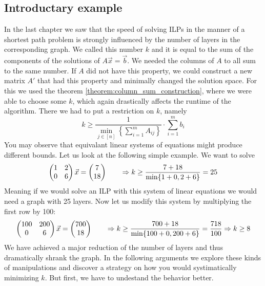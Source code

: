 \subsection{Introductary example}
In the last chapter we saw that the speed of solving ILPs in the manner of a shortest path problem is strongly influenced by the number of layers in the corresponding graph. We called this number $k$ and it is equal to the sum of the components of the solutions of $A\vec x=\vec b$. We needed the columns of $A$ to all sum to the same number. If $A$ did not have this property, we could construct a new matrix $A'$ that had this property and minimally changed the solution space. For this we used the theorem \ref{theorem:column_sum_construction}, where we were able to choose some $k$, which again drastically affects the runtime of the algorithm. There we had to put a restriction on $k$, namely
$$k \geq \frac{1}{\min_{j \in [n]} \left\{ \sum_{i=1}^{m}A_{ij}\right\}}\cdot \sum_{i=1}^{m}b_i$$
You may observe that equivalant linear systems of equations might produce different bounds. Let us look at the following simple example. We want to solve 
$$\left(\begin{matrix}1&2\\0&6\end{matrix}\right)\vec x = \left(\begin{matrix}7\\18\end{matrix}\right) \qquad \Rightarrow k \geq \frac{7 + 18}{\min\{1+0, 2+6\}} = 25$$
Meaning if we would solve an ILP with this system of linear equations we would need a graph with 25 layers. Now let us modify this system by multiplying the first row by 100:
$$\left(\begin{matrix}100&200\\0&6\end{matrix}\right)\vec x = \left(\begin{matrix}700\\18\end{matrix}\right) \qquad \Rightarrow k \geq \frac{700 + 18}{\min\{100+0, 200+6\}} = \frac{718}{100} \Rightarrow k \geq 8$$
We have achieved a major reduction of the number of layers and thus dramatically shrank the graph. In the following arguments we explore these kinds of manipulations and discover a strategy on how you would systimatically minimizing $k$. But first, we have to undestand the behavior better.

